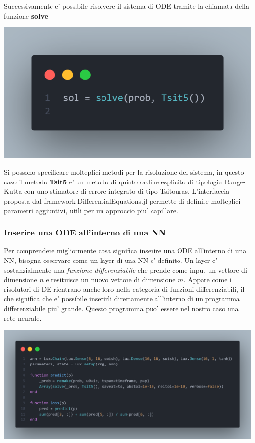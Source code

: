 Successivamente e' possibile risolvere il sistema di ODE tramite la chiamata
della funzione \textbf{solve}

\begin{minipage}{\linewidth}
    \centering
    \includegraphics[width=\textwidth]{img/fsolution.png}
    \label{fig:ODE_Julia_res_example}
\end{minipage}

Si possono specificare molteplici metodi per la risoluzione del sistema, in 
questo caso il metodo \textbf{Tsit5} \cite{10.1016/j.camwa.2011.06.002} e' un metodo 
di quinto ordine esplicito di tipologia Runge-Kutta con uno stimatore di errore
integrato di tipo Tsitouras. L'interfaccia proposta dal framework DifferentialEquations.jl 
permette di definire molteplici parametri aggiuntivi, utili per un approccio piu' capillare.

\subsubsection*{Inserire una ODE all'interno di una NN}
Per comprendere migliormente cosa significa inserire una ODE all'interno di una 
NN, bisogna osservare come un layer di una NN e' definito. Un layer e' sostanzialmente
una \emph{funzione differenziabile} che prende come input un vettore di dimensione $n$ 
e resituisce un nuovo vettore di dimensione $m$. Appare come i risolutori di DE rientrano 
anche loro nella categoria di funzioni differenziabili, il che significa che e' possibile
inserirli direttamente all'interno di un programma differenziabile piu' grande.
Questo programma puo' essere nel nostro caso una rete neurale. 

\begin{minipage}{\linewidth}
    \centering
    \includegraphics[width=\textwidth]{img/fann.png}
    \label{fig:NN_Julia_example}
\end{minipage}


